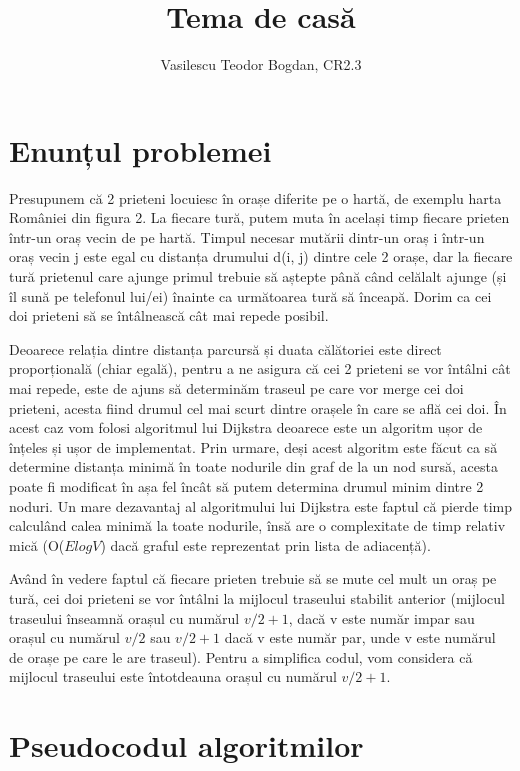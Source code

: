 \documentclass[a4paper]{article}
\title{{\myfont Tema de casă}}
\author{{\myfont Vasilescu Teodor Bogdan, CR2.3}}
\date{}
\begin{document}
\maketitle

\pagebreak


\section{Enunțul problemei}


Presupunem că 2 prieteni locuiesc în orașe diferite pe o hartă, de exemplu harta României din figura 2. 
La fiecare tură, putem muta în același timp fiecare prieten într-un oraș vecin de pe hartă. 
Timpul necesar mutării dintr-un oraș i într-un oraș vecin j este egal cu distanța drumului d(i, j) dintre cele 2 orașe, dar la fiecare tură prietenul
care ajunge primul trebuie să aștepte până când celălalt ajunge (și îl sună pe telefonul lui/ei) înainte ca următoarea tură să înceapă. 
Dorim ca cei doi prieteni să se întâlnească cât mai repede posibil. 

Deoarece relația dintre distanța parcursă și duata călătoriei este direct proporțională (chiar egală), pentru a ne asigura că cei 2 prieteni se vor întâlni cât mai repede, este de ajuns să determinăm traseul pe care vor merge cei doi prieteni, acesta fiind drumul cel mai scurt dintre orașele în care se află cei doi.
În acest caz vom folosi algoritmul lui Dijkstra deoarece este un algoritm ușor de înțeles și ușor de implementat. 
Prin urmare, deși acest algoritm este făcut ca să determine distanța minimă în toate nodurile din graf de la un nod sursă, acesta poate fi modificat în așa fel încât să putem determina drumul minim dintre 2 noduri. 
Un mare dezavantaj al algoritmului lui Dijkstra este faptul că pierde timp calculând calea minimă la toate nodurile, însă are o complexitate de timp relativ mică (O($ElogV$) dacă graful este reprezentat prin lista de adiacență).

Având în vedere faptul că fiecare prieten trebuie să se mute cel mult un oraș pe tură, cei doi prieteni se vor întâlni la mijlocul traseului stabilit anterior (mijlocul traseului înseamnă orașul cu numărul $v/2 + 1$, dacă v este număr impar sau orașul cu numărul $v/2$ sau $v/2 + 1$ dacă v este număr par, unde v este numărul de orașe pe care le are traseul). Pentru a simplifica codul, vom considera că mijlocul traseului este întotdeauna orașul cu numărul $v/2 + 1$. 

\section {Pseudocodul algoritmilor}
 
\end{document}
